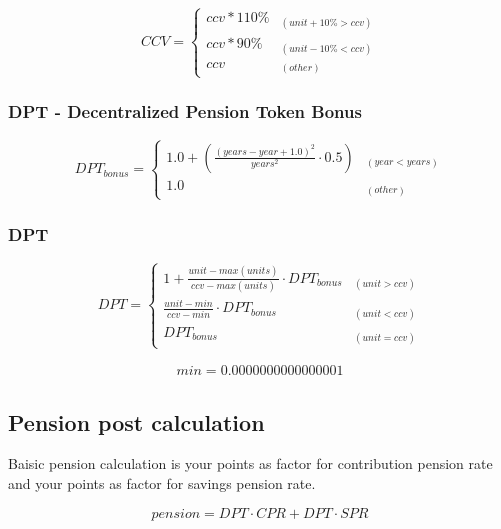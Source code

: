\begin{equation*}
CCV = \begin{cases} 
ccv * 110\% & _{(unit+10\% > ccv)} \\
ccv * 90\% & _{(unit-10\% < ccv)} \\
ccv & _{(other)}
\end{cases}
\end{equation*}

\subsubsection*{DPT - Decentralized Pension Token Bonus}

\begin{equation*}
DPT_{bonus} = \begin{cases} 
1.0 + (\frac{(years - year + 1.0)^2}
      {years^2} \cdot 0.5) & _{(year < years)} \\
1.0 & _{(other)} 
\end{cases}
\end{equation*}


\subsubsection*{DPT}

\begin{equation*}
DPT = \begin{cases} 
1 + \frac{unit-max(units)} {ccv - max(units)} 
 \cdot DPT_{bonus} & _{(unit > ccv)} \\
\frac{unit - min} {ccv - min} 
 \cdot DPT_{bonus} & _{(unit < ccv)} \\
DPT_{bonus} & _{(unit = ccv)}
\end{cases}
\end{equation*}

\begin{eqnarray}
	min = 0.0000000000000001
\end{eqnarray}



\newpage

\subsection{Pension post calculation}

Baisic pension calculation is your points
as factor for contribution pension rate and 
your points as factor for savings pension rate.

\begin{equation*}
pension = DPT \cdot CPR + DPT \cdot SPR
\end{equation*}

